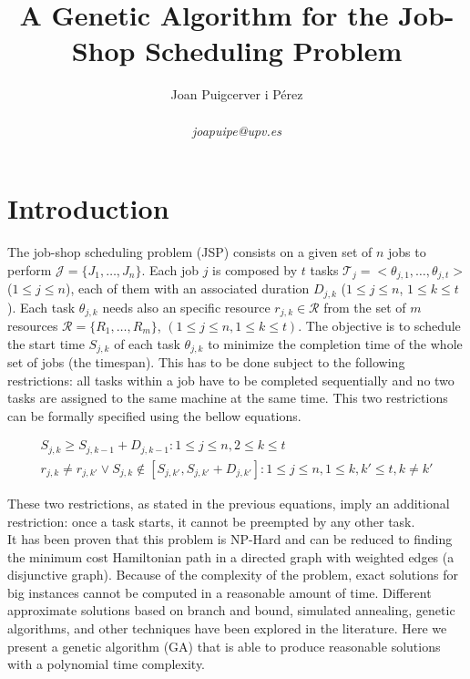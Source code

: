 \documentclass[10pt,a4paper]{article}
\author{Joan Puigcerver i Pérez\\
\begin{footnotesize}
\textit{joapuipe@upv.es}
\end{footnotesize}}
\title{A Genetic Algorithm for the Job-Shop Scheduling Problem}
\begin{document}
\maketitle
\section{Introduction}
The job-shop scheduling problem (JSP) consists on a given set of $n$ jobs to perform $\mathcal{J} = \{J_1, \ldots, J_n\}$. Each job $j$ is composed by $t$ tasks $\mathcal{T}_j = <\theta_{j,1}, \ldots, \theta_{j,t}>$ ($1 \leq j \leq n$), each of them with an associated duration $D_{j,k}$ ($1 \leq j \leq n$, $1 \leq k \leq t$). Each task $\theta_{j,k}$ needs also an specific resource $r_{j,k} \in \mathcal{R}$ from the set of $m$ resources $\mathcal{R} = \{R_1, \ldots, R_m\}$, $(1 \leq j \leq n, 1 \leq k \leq t)$. The objective is to schedule the start time $S_{j,k}$ of each task $\theta_{j,k}$ to minimize the completion time of the whole set of jobs (the timespan). This has to be done subject to the following restrictions: all tasks within a job have to be completed sequentially and no two tasks are assigned to the same machine at the same time. This two restrictions can be formally specified using the bellow equations.

\begin{eqnarray}
S_{j,k} \geq S_{j,k-1} + D_{j,k-1} : 1 \leq j \leq n, 2 \leq k \leq t \label{eq:consecutive_tasks} \\
r_{j,k} \neq r_{j,k'} \vee S_{j,k} \notin  [S_{j,k'}, S_{j,k'} + D_{j,k'}] : 1 \leq j \leq n, 1 \leq k,k' \leq t, k \neq k' \label{eq:single_core_machines}
\end{eqnarray}

These two restrictions, as stated in the previous equations, imply an additional restriction: once a task starts, it cannot be preempted by any other task.\\

It has been proven that this problem is NP-Hard and can be reduced to finding the minimum cost Hamiltonian path in a directed graph with weighted edges (a disjunctive graph)\cite{lenstra1977complexity,lenstra1979computational,blazewicz2000disjunctive}. Because of the complexity of the problem, exact solutions for big instances cannot be computed in a reasonable amount of time. Different approximate solutions based on branch and bound\cite{carlier1989algorithm}, simulated annealing\cite{van1992job}, genetic algorithms\cite{davis1985job}, and other techniques have been explored in the literature. Here we present a genetic algorithm (GA) that is able to produce reasonable solutions with a polynomial time complexity.
\end{document}

